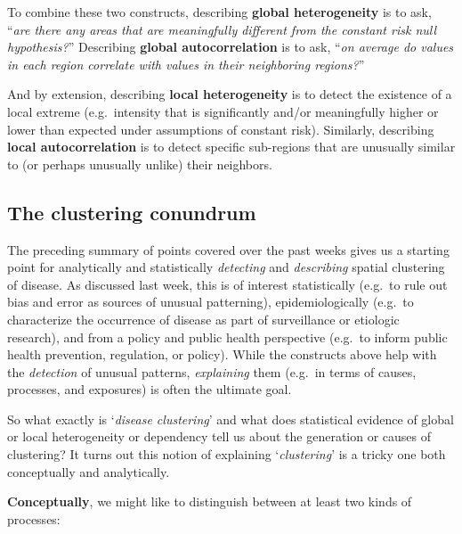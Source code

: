 \documentclass[
]{book}
\begin{document}
To combine these two constructs, describing \textbf{global heterogeneity} is to ask, ``\emph{are there any areas that are meaningfully different from the constant risk null hypothesis?}'' Describing \textbf{global autocorrelation} is to ask, ``\emph{on average do values in each region correlate with values in their neighboring regions?}''

And by extension, describing \textbf{local heterogeneity} is to detect the existence of a local extreme (e.g.~intensity that is significantly and/or meaningfully higher or lower than expected under assumptions of constant risk). Similarly, describing \textbf{local autocorrelation} is to detect specific sub-regions that are unusually similar to (or perhaps unusually unlike) their neighbors.

\hypertarget{the-clustering-conundrum}{%
\subsection{The clustering conundrum}\label{the-clustering-conundrum}}

The preceding summary of points covered over the past weeks gives us a starting point for analytically and statistically \emph{detecting} and \emph{describing} spatial clustering of disease. As discussed last week, this is of interest statistically (e.g.~to rule out bias and error as sources of unusual patterning), epidemiologically (e.g.~to characterize the occurrence of disease as part of surveillance or etiologic research), and from a policy and public health perspective (e.g.~to inform public health prevention, regulation, or policy). While the constructs above help with the \emph{detection} of unusual patterns, \emph{explaining} them (e.g.~in terms of causes, processes, and exposures) is often the ultimate goal.

So what exactly is `\emph{disease clustering}' and what does statistical evidence of global or local heterogeneity or dependency tell us about the generation or causes of clustering? It turns out this notion of explaining `\emph{clustering}' is a tricky one both conceptually and analytically.

\textbf{Conceptually}, we might like to distinguish between at least two kinds of processes:
\end{document}
